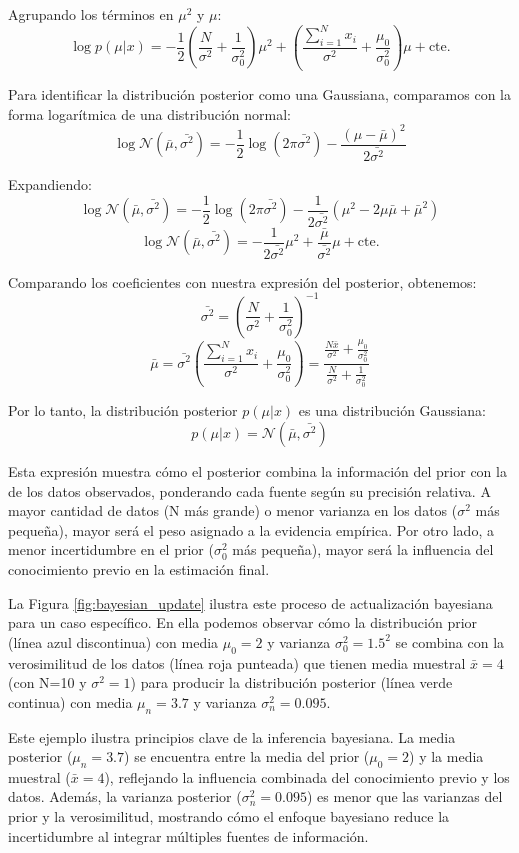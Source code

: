 Agrupando los términos en \(\mu^2\) y \(\mu\):
\[\log p(\mu|x)=-\frac{1}{2}\left(\frac{N}{\sigma^2}+\frac{1}{\sigma_{0}^2}\right)\mu^2+\left(\frac{\sum_{i=1}^{N}x_i}{\sigma^2}+\frac{\mu_0}{\sigma_0^2}\right)\mu+\text{cte.}\]

Para identificar la distribución posterior como una Gaussiana, comparamos con la forma logarítmica de una distribución normal:
\[\log \mathcal{N}(\bar{\mu},\bar{\sigma^2}) = -\frac{1}{2}\log(2\pi\bar{\sigma^2}) - \frac{(\mu-\bar{\mu})^2}{2\bar{\sigma^2}}\]

Expandiendo:
\[\log \mathcal{N}(\bar{\mu},\bar{\sigma^2}) = -\frac{1}{2}\log(2\pi\bar{\sigma^2}) - \frac{1}{2\bar{\sigma^2}}(\mu^2 - 2\mu\bar{\mu} + \bar{\mu}^2)\]
\[\log \mathcal{N}(\bar{\mu},\bar{\sigma^2}) = -\frac{1}{2\bar{\sigma^2}}\mu^2 + \frac{\bar{\mu}}{\bar{\sigma^2}}\mu + \text{cte.}\]

Comparando los coeficientes con nuestra expresión del posterior, obtenemos:
\[\bar{\sigma^2} = \left(\frac{N}{\sigma^2} + \frac{1}{\sigma_0^2}\right)^{-1}\]
\[\bar{\mu} = \bar{\sigma^2}\left(\frac{\sum_{i=1}^{N}x_i}{\sigma^2} + \frac{\mu_0}{\sigma_0^2}\right) = \frac{\frac{N\bar{x}}{\sigma^2} + \frac{\mu_0}{\sigma_0^2}}{\frac{N}{\sigma^2} + \frac{1}{\sigma_0^2}}\]

Por lo tanto, la distribución posterior \(p(\mu|x)\) es una distribución Gaussiana:
\[p(\mu|x) = \mathcal{N}(\bar{\mu}, \bar{\sigma^2})\]

Esta expresión muestra cómo el posterior combina la información del prior con la de los datos observados, ponderando cada fuente según su precisión relativa. A mayor cantidad de datos (N más grande) o menor varianza en los datos ($\sigma^2$ más pequeña), mayor será el peso asignado a la evidencia empírica. Por otro lado, a menor incertidumbre en el prior ($\sigma_0^2$ más pequeña), mayor será la influencia del conocimiento previo en la estimación final.

La Figura \ref{fig:bayesian_update} ilustra este proceso de actualización bayesiana para un caso específico. En ella podemos observar cómo la distribución prior (línea azul discontinua) con media $\mu_0=2$ y varianza $\sigma_0^2=1.5^2$ se combina con la verosimilitud de los datos (línea roja punteada) que tienen media muestral $\bar{x}=4$ (con N=10 y $\sigma^2=1$) para producir la distribución posterior (línea verde continua) con media $\mu_n=3.7$ y varianza $\sigma_n^2=0.095$.

Este ejemplo ilustra principios clave de la inferencia bayesiana. La media posterior ($\mu_n=3.7$) se encuentra entre la media del prior ($\mu_0=2$) y la media muestral ($\bar{x}=4$), reflejando la influencia combinada del conocimiento previo y los datos. Además, la varianza posterior ($\sigma_n^2=0.095$) es menor que las varianzas del prior y la verosimilitud, mostrando cómo el enfoque bayesiano reduce la incertidumbre al integrar múltiples fuentes de información.
